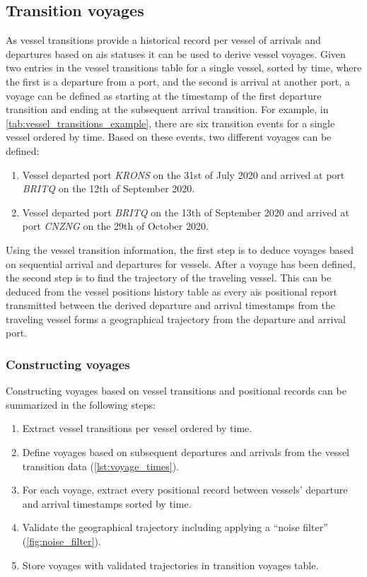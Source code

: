 
\subsection{Transition voyages}

As vessel transitions provide a historical record per vessel of arrivals and departures based on \acrshort{ais} statuses it can be used to derive vessel voyages. Given two entries in the vessel transitions table for a single vessel, sorted by time, where the first is a departure from a port, and the second is arrival at another port, a voyage can be defined as starting at the timestamp of the first departure transition and ending at the subsequent arrival transition. For example, in \cref{tab:vessel_transitions_example}, there are six transition events for a single vessel ordered by time. Based on these events, two different voyages can be defined:

\begin{enumerate}
    \item  Vessel departed port \textit{KRONS} on the 31st of July 2020 and arrived at port \textit{BRITQ} on the 12th of September 2020.
    \item  Vessel departed port \textit{BRITQ} on the 13th of September 2020 and arrived at port \textit{CNZNG} on the 29th of October 2020.
\end{enumerate}

Using the vessel transition information, the first step is to deduce voyages based on sequential arrival and departures for vessels. After a voyage has been defined, the second step is to find the trajectory of the traveling vessel. This can be deduced from the vessel positions history table as every \acrshort{ais} positional report transmitted between the derived departure and arrival timestamps from the traveling vessel forms a geographical trajectory from the departure and arrival port.

\subsubsection{Constructing voyages}

Constructing voyages based on vessel transitions and positional records can be summarized in the following steps:

\begin{enumerate}
    \item Extract vessel transitions per vessel ordered by time.
    \item Define voyages based on subsequent departures and arrivals from the vessel transition data (\cref{lst:voyage_times}).
    \item For each voyage, extract every positional record between vessels' departure and arrival timestamps sorted by time.
    \item Validate the geographical trajectory including applying a ``noise filter'' (\cref{fig:noise_filter}).
    \item Store voyages with validated trajectories in transition voyages table.
\end{enumerate}

